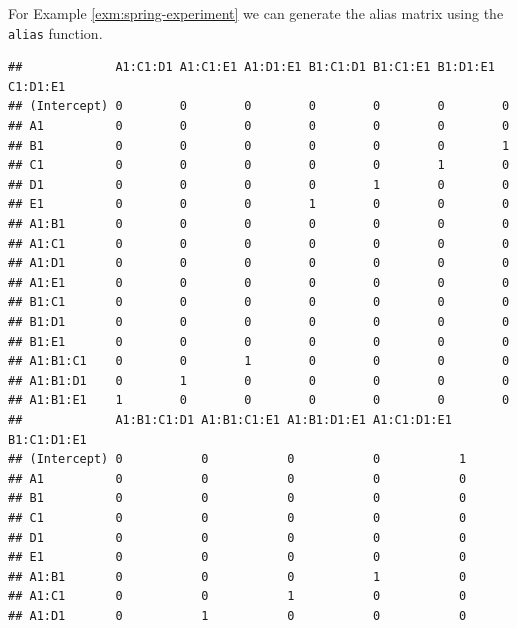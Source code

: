 \documentclass[
]{book}
\newenvironment{Shaded}{\begin{snugshade}}{\end{snugshade}}
\newcommand{\FunctionTok}[1]{\textcolor[rgb]{0.00,0.00,0.00}{#1}}
\newcommand{\NormalTok}[1]{#1}
\newcommand{\SpecialCharTok}[1]{\textcolor[rgb]{0.00,0.00,0.00}{#1}}
\theoremstyle{definition}
\theoremstyle{definition}
\theoremstyle{definition}
\theoremstyle{definition}
\theoremstyle{remark}
\begin{document}
For Example \ref{exm:spring-experiment} we can generate the alias matrix using the \texttt{alias} function.

\begin{Shaded}
\end{Shaded}

\begin{verbatim}
##             A1:C1:D1 A1:C1:E1 A1:D1:E1 B1:C1:D1 B1:C1:E1 B1:D1:E1 C1:D1:E1
## (Intercept) 0        0        0        0        0        0        0       
## A1          0        0        0        0        0        0        0       
## B1          0        0        0        0        0        0        1       
## C1          0        0        0        0        0        1        0       
## D1          0        0        0        0        1        0        0       
## E1          0        0        0        1        0        0        0       
## A1:B1       0        0        0        0        0        0        0       
## A1:C1       0        0        0        0        0        0        0       
## A1:D1       0        0        0        0        0        0        0       
## A1:E1       0        0        0        0        0        0        0       
## B1:C1       0        0        0        0        0        0        0       
## B1:D1       0        0        0        0        0        0        0       
## B1:E1       0        0        0        0        0        0        0       
## A1:B1:C1    0        0        1        0        0        0        0       
## A1:B1:D1    0        1        0        0        0        0        0       
## A1:B1:E1    1        0        0        0        0        0        0       
##             A1:B1:C1:D1 A1:B1:C1:E1 A1:B1:D1:E1 A1:C1:D1:E1 B1:C1:D1:E1
## (Intercept) 0           0           0           0           1          
## A1          0           0           0           0           0          
## B1          0           0           0           0           0          
## C1          0           0           0           0           0          
## D1          0           0           0           0           0          
## E1          0           0           0           0           0          
## A1:B1       0           0           0           1           0          
## A1:C1       0           0           1           0           0          
## A1:D1       0           1           0           0           0          

\end{verbatim}
\end{document}
